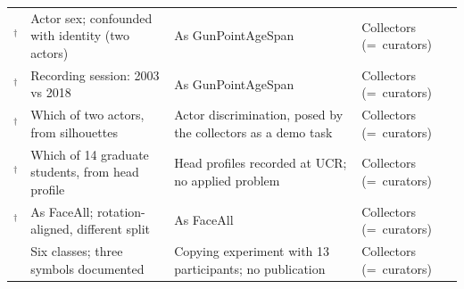 \begin{longtable}{@{}P{3.2cm} P{3.2cm} P{4.1cm} P{1.9cm}@{}}
$^\dagger$ & Actor sex; confounded with identity (two actors) & As GunPointAgeSpan & Collectors (=~curators) \\
$^\dagger$ & Recording session: 2003 vs 2018 & As GunPointAgeSpan & Collectors (=~curators) \\
$^\dagger$ & Which of two actors, from silhouettes & Actor discrimination, posed by the collectors as a demo task & Collectors (=~curators) \\
$^\dagger$ & Which of 14 graduate students, from head profile & Head profiles recorded at UCR; no applied problem & Collectors (=~curators) \\
$^\dagger$ & As FaceAll; rotation-aligned, different split & As FaceAll & Collectors (=~curators) \\
 & Six classes; three symbols documented & Copying experiment with 13 participants; no publication & Collectors (=~curators) \\
\end{longtable}
